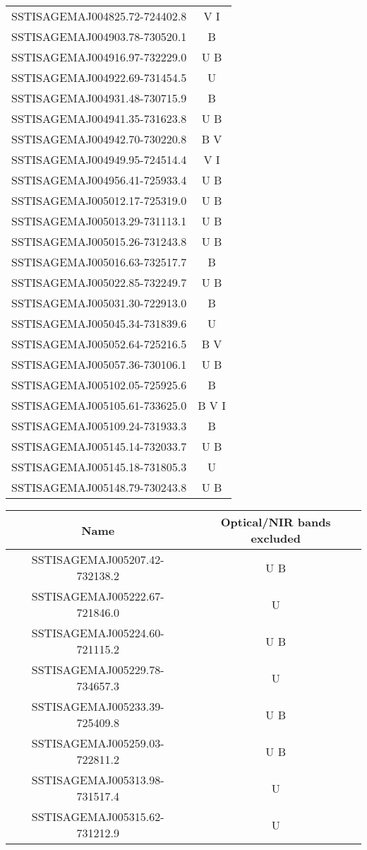 \documentclass[useAMS,usenatbib]{mn2e/mn2e}
\begin{document}
{\begin{table*}
\begin{tabular}{c c}
SSTISAGEMAJ004825.72-724402.8& V I\\
SSTISAGEMAJ004903.78-730520.1& B\\
SSTISAGEMAJ004916.97-732229.0& U B\\
SSTISAGEMAJ004922.69-731454.5& U\\
SSTISAGEMAJ004931.48-730715.9& B\\
SSTISAGEMAJ004941.35-731623.8& U B\\
SSTISAGEMAJ004942.70-730220.8& B V\\
SSTISAGEMAJ004949.95-724514.4& V I\\
SSTISAGEMAJ004956.41-725933.4& U B\\
SSTISAGEMAJ005012.17-725319.0& U B\\
SSTISAGEMAJ005013.29-731113.1& U B\\
SSTISAGEMAJ005015.26-731243.8& U B\\
SSTISAGEMAJ005016.63-732517.7& B\\
SSTISAGEMAJ005022.85-732249.7& U B\\
SSTISAGEMAJ005031.30-722913.0& B\\
SSTISAGEMAJ005045.34-731839.6& U\\
SSTISAGEMAJ005052.64-725216.5& B V\\
SSTISAGEMAJ005057.36-730106.1& U B\\
SSTISAGEMAJ005102.05-725925.6& B\\
SSTISAGEMAJ005105.61-733625.0& B V I\\
SSTISAGEMAJ005109.24-731933.3& B\\
SSTISAGEMAJ005145.14-732033.7& U B\\
SSTISAGEMAJ005145.18-731805.3& U\\
SSTISAGEMAJ005148.79-730243.8& U B\\
\hline
\end{tabular}
\begin{tabular}{c c}
\hline
Name & Optical/NIR bands excluded\\
\hline
SSTISAGEMAJ005207.42-732138.2& U B\\
SSTISAGEMAJ005222.67-721846.0& U\\
SSTISAGEMAJ005224.60-721115.2& U B\\
SSTISAGEMAJ005229.78-734657.3& U\\
SSTISAGEMAJ005233.39-725409.8& U B\\
SSTISAGEMAJ005259.03-722811.2& U B\\
SSTISAGEMAJ005313.98-731517.4& U\\
SSTISAGEMAJ005315.62-731212.9& U\\

\end{tabular}
\end{table*}}
\end{document}
